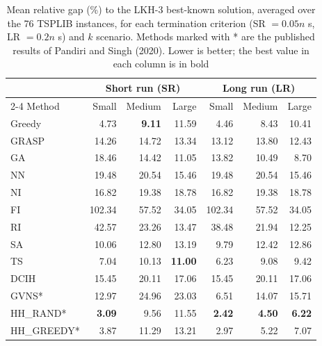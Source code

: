 \begin{table}[t]
\centering
\caption{Mean relative gap (\%) to the LKH-3 best-known solution, averaged over the 76 TSPLIB instances, for each termination criterion (SR $=0.05n$ s, LR $=0.2n$ s) and $k$ scenario. Methods marked with * are the published results of Pandiri and Singh (2020). Lower is better; the best value in each column is in bold}
\label{tab:gap}
\begin{tabular}{l rrr rrr}
\hline
 & \multicolumn{3}{c}{Short run (SR)} & \multicolumn{3}{c}{Long run (LR)} \\
\cline{2-4}\cline{5-7}
Method & Small & Medium & Large & Small & Medium & Large \\
\hline
Greedy & 4.73 & \textbf{9.11} & 11.59 & 4.46 & 8.43 & 10.41 \\
GRASP & 14.26 & 14.72 & 13.34 & 13.12 & 13.80 & 12.43 \\
GA & 18.46 & 14.42 & 11.05 & 13.82 & 10.49 & 8.70 \\
NN & 19.48 & 20.54 & 15.46 & 19.48 & 20.54 & 15.46 \\
NI & 16.82 & 19.38 & 18.78 & 16.82 & 19.38 & 18.78 \\
FI & 102.34 & 57.52 & 34.05 & 102.34 & 57.52 & 34.05 \\
RI & 42.57 & 23.26 & 13.47 & 38.48 & 21.94 & 12.25 \\
SA & 10.06 & 12.80 & 13.19 & 9.79 & 12.42 & 12.86 \\
TS & 7.04 & 10.13 & \textbf{11.00} & 6.23 & 9.08 & 9.42 \\
DCIH & 15.45 & 20.11 & 17.06 & 15.45 & 20.11 & 17.06 \\
GVNS* & 12.97 & 24.96 & 23.03 & 6.51 & 14.07 & 15.71 \\
HH\_RAND* & \textbf{3.09} & 9.56 & 11.55 & \textbf{2.42} & \textbf{4.50} & \textbf{6.22} \\
HH\_GREEDY* & 3.87 & 11.29 & 13.21 & 2.97 & 5.22 & 7.07 \\
\hline
\end{tabular}
\end{table}
